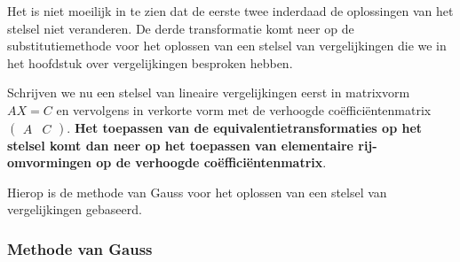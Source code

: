 Het is niet moeilijk in te zien dat de eerste twee inderdaad de oplossingen van het stelsel niet veranderen. De derde transformatie komt neer op de substitutiemethode voor het oplossen van een stelsel van vergelijkingen die we in het hoofdstuk over vergelijkingen besproken hebben. 

Schrijven we nu een stelsel van lineaire vergelijkingen eerst in matrixvorm\\ $AX=C$ en vervolgens in verkorte vorm met de verhoogde co\"{e}ffici\"{e}ntenmatrix $\left( \begin{array}{c|c} A & C \end{array} \right)$. {\bf Het toepassen van de equivalentietransformaties op het stelsel komt dan neer op het toepassen van elementaire rij-omvormingen op de verhoogde co\"{e}ffici\"{e}ntenmatrix}. 

Hierop is de methode van Gauss voor het oplossen van een stelsel van vergelijkingen gebaseerd.

\subsubsection{Methode van Gauss}


